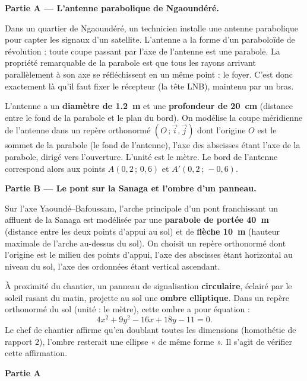 \documentclass[11pt]{article}
\newcommand{\cle}[1]{{\popxbold\color{popdark}#1}}
\newcounter{popsec}
\newcounter{popsub}
\newcommand{\courssub}[1]{%
  \stepcounter{popsub}%
  \par\vspace{9pt}\noindent{\popxbold\fontsize{11.5}{13}\selectfont\color{popink}{\color{poporange}\thepopsec.\thepopsub}\hspace{6pt}#1}\par\nopagebreak\vspace{4pt}
}
\begin{document}
\courssub{Situation}

\textbf{Partie A — L'antenne parabolique de Ngaoundéré.}

Dans un quartier de Ngaoundéré, un technicien installe une antenne parabolique pour capter les signaux d'un satellite. L'antenne a la forme d'un paraboloïde de révolution : toute coupe passant par l'axe de l'antenne est une \cle{parabole}. La propriété remarquable de la parabole est que tous les rayons arrivant parallèlement à son axe se réfléchissent en un même point : le \cle{foyer}. C'est donc exactement là qu'il faut fixer le récepteur (la tête LNB), maintenu par un bras.

L'antenne a un \textbf{diamètre de \SI{1,2}{m}} et une \textbf{profondeur de \SI{20}{cm}} (distance entre le fond de la parabole et le plan du bord). On modélise la coupe méridienne de l'antenne dans un repère orthonormé $(O\,;\vec{i},\vec{j})$ dont l'origine $O$ est le sommet de la parabole (le fond de l'antenne), l'axe des abscisses étant l'axe de la parabole, dirigé vers l'ouverture. L'unité est le mètre. Le bord de l'antenne correspond alors aux points $A(0,2\,;\,0,6)$ et $A'(0,2\,;\,-0,6)$.

\textbf{Partie B — Le pont sur la Sanaga et l'ombre d'un panneau.}

Sur l'axe Yaoundé--Bafoussam, l'arche principale d'un pont franchissant un affluent de la Sanaga est modélisée par une \textbf{parabole de portée \SI{40}{m}} (distance entre les deux points d'appui au sol) et de \textbf{flèche \SI{10}{m}} (hauteur maximale de l'arche au-dessus du sol). On choisit un repère orthonormé dont l'origine est le milieu des points d'appui, l'axe des abscisses étant horizontal au niveau du sol, l'axe des ordonnées étant vertical ascendant.

À proximité du chantier, un panneau de signalisation \textbf{circulaire}, éclairé par le soleil rasant du matin, projette au sol une \textbf{ombre elliptique}. Dans un repère orthonormé du sol (unité : le mètre), cette ombre a pour équation :
\[ 4x^2+9y^2-16x+18y-11=0. \]
Le chef de chantier affirme qu'en doublant toutes les dimensions (homothétie de rapport $2$), l'ombre resterait une ellipse « de même forme ». Il s'agit de vérifier cette affirmation.

\courssub{Consignes}

\textbf{Partie A}
\end{document}
